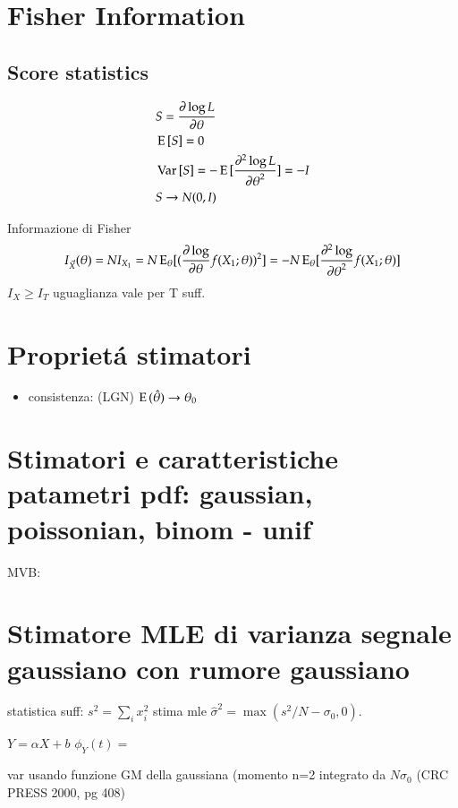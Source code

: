 \documentclass[main.tex]{subfiles}
\begin{document}
\section{Fisher Information}

\subsection{Score statistics}

\begin{align*}
&S=\frac{\partial \log{L}}{\partial \theta}\\
&\operatorname{E}{[S]}=0\\
&\operatorname{Var}{[S]}=-\operatorname{E}{[\frac{\partial^2 \log{L}}{{\partial \theta}^2}]}=-I\\
&S\to N(0,I)
\end{align*}

Informazione di Fisher
\[I_{\Vec{X}}(\theta)=NI_{X_1}=N\operatorname{E}_{\theta}[(\frac{\partial \log}{\partial \theta}{f(X_1;\theta)})^2]=-N\operatorname{E}_{\theta}[\frac{\partial^2 \log}{{\partial \theta}^2}{f(X_1;\theta)}]\]
$I_{X}\geq I_T$ uguaglianza vale per T suff.

\section{Propriet\'a stimatori}

\begin{itemize}
\item consistenza: (LGN) $\operatorname{E}{(\hat{\theta})}\to\theta_0$
\end{itemize}

\section{Stimatori e caratteristiche patametri pdf: gaussian, poissonian, binom - unif}

MVB:

\section{Stimatore MLE di varianza segnale gaussiano con rumore gaussiano}

statistica suff: $s^2=\sum_ix_i^2$
stima mle $\hat{\sigma}^2=\max{(s^2/N-\sigma_0,0)}$.

$Y=\alpha X+b$ $\phi_Y(t)=$

var usando funzione GM della gaussiana
(momento n=2 integrato da $N\sigma_0$
(CRC PRESS 2000, pg 408)
\end{document}

